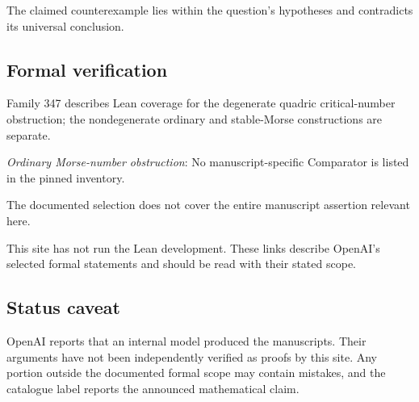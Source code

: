 \documentclass[11pt]{article}
\begin{document}
The claimed counterexample lies within the question’s hypotheses and contradicts its universal conclusion.

\subsection{Formal verification}
Family 347 describes Lean coverage for the degenerate quadric critical-number obstruction; the nondegenerate ordinary and stable-Morse constructions are separate.

\textit{Ordinary Morse-number obstruction}: No manuscript-specific Comparator is listed in the pinned inventory.

The documented selection does not cover the entire manuscript assertion relevant here.

This site has not run the Lean development. These links describe OpenAI’s selected formal statements and should be read with their stated scope.

\subsection{Status caveat}
OpenAI reports that an internal model produced the manuscripts. Their arguments have not been independently verified as proofs by this site. Any portion outside the documented formal scope may contain mistakes, and the catalogue label reports the announced mathematical claim.
\end{document}
